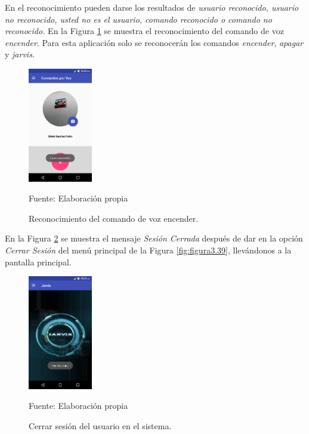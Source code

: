 En el reconocimiento pueden darse los resultados de \textit{usuario reconocido, usuario no reconocido, usted no es el usuario, comando reconocido o comando no reconocido.} En la Figura \ref{fig:figura3.51} se muestra el reconocimiento del comando de voz \textit{encender}. Para esta aplicación solo se reconocerán los comandos \textit{encender}, \textit{apagar} y \textit{jarvis}.
\begin{figure}[H]
\captionsetup{justification=centering}
\begin{center}
\includegraphics[width=0.25\textwidth]{Imagenes/Cap3/image051}
\end{center}
\begin{center}
\vskip -0.5cm
\caption{\small{Reconocimiento del comando de voz encender.}}
\label{fig:figura3.51}
{\small{Fuente: Elaboración propia}}
\end{center}
\end{figure}

En la Figura \ref{fig:figura3.52} se muestra el mensaje \textit{Sesión Cerrada} después de dar en la opción \textit{Cerrar Sesión} del menú principal de la Figura \ref{fig:figura3.39}, llevándonos a la pantalla principal.
\begin{figure}[H]
\captionsetup{justification=centering}
\begin{center}
\includegraphics[width=0.25\textwidth]{Imagenes/Cap3/image052}
\end{center}
\begin{center}
\vskip -0.5cm
\caption{\small{Cerrar sesión del usuario en el sistema.}}
\label{fig:figura3.52}
{\small{Fuente: Elaboración propia}}
\end{center}
\end{figure}

